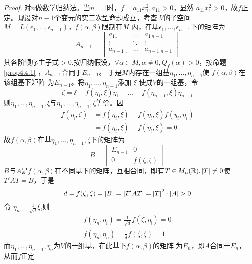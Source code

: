 \documentclass[11pt]{article}
\begin{document}
\begin{proof}
对\(n\)做数学归纳法。当\(n=1\)时，\(f=a_{11}x_1^2,a_{11}>0\)，显然
\(a_{11}x_1^2>0\)，故\(f\)正定。现设对\(n-1\)个变元的实二次型命题成立，考查
\(V\)的子空间\(M=L(\epsilon_1,\dots,\epsilon_{n-1})\)，\(f(\alpha,\beta)\)限制在\(M\)
内，在基\(\epsilon_1,\dots,\epsilon_{n-1}\)下的矩阵为
\begin{equation*}
A_{n-1}=
\begin{bmatrix}
a_{11}&\dots&a_{1\;n-1}\\
\vdots&\ddots&\vdots\\
a_{n-1\;1}&\dots&a_{n-1\;n-1}\\
\end{bmatrix}
\end{equation*}
其各阶顺序主子式\(>0\).按归纳假设，\(\forall\alpha\in
   M,\alpha\neq0,Q_f(\alpha)>0\)，按命题 \ref{prop4.4.1} ，\(A_{n-1}\)合同于\(E_{n-1}\)。
于是\(M\)内存在一组基\(\eta_1,\dots,\eta_{n-1}\)使 \(f(\alpha,\beta)\)在该组基下矩阵
为\(E_{n-1}\)。将\(\eta_1,\dots,\eta_{n-1}\)添加 \(\xi\) 使成\(V\)的一组基，令
\begin{equation*}
\zeta=\xi-f(\eta_1,\xi)\eta_1-\dots-f(\eta_{n-1},\xi)\eta_{n-1}
\end{equation*}
则\(\eta_1,\dots,\eta_{n-1},\xi\)与\(\eta_1,\dots,\eta_{n-1},\zeta\)等价。因
\begin{align*}
f(\eta_i,\zeta)&=f(\eta_i,\xi)-f(\eta_i,\xi)f(\eta_i,\eta_i)\\
&=f(\eta_i,\xi)-f(\eta_i,\xi)=0
\end{align*}
故\(f(\alpha,\beta)\)在基\(\eta_1,\dots,\eta_{n-1},\zeta\)下的矩阵为
\begin{equation*}
B=
\begin{bmatrix}
E_{n-1}&0\\
0&f(\zeta,\zeta)
\end{bmatrix}
\end{equation*}
\(B\)与\(A\)是\(f(\alpha,\beta)\)在不同基下的矩阵，互相合同，即有\(T\in
   M_n(\R),\abs{T}\neq0\)使\(T'AT=B\)，于是
\begin{equation*}
d=f(\zeta,\zeta)=\abs{B}=\abs{T'AT}=\abs{T}^2\cdot\abs{A}>0
\end{equation*}
令 \(\eta_n=\frac{1}{\sqrt{d}}\xi\),则
\begin{align*}
f(\eta_n,\eta_i)=\frac{1}{\sqrt{d}}f(\zeta,\eta_i)=0\\
f(\eta_n,\eta_n)=\frac{1}{d}f(\zeta,\zeta)=1
\end{align*}
而\(\eta_1,\dots,\eta_{n-1},\eta_n\)为\(V\)的一组基，在此基下\(f(\alpha,\beta)\)的矩阵
为\(E_n\)，即\(A\)合同于\(E_n\)，从而\(f\)正定
\end{proof}
\end{document}
